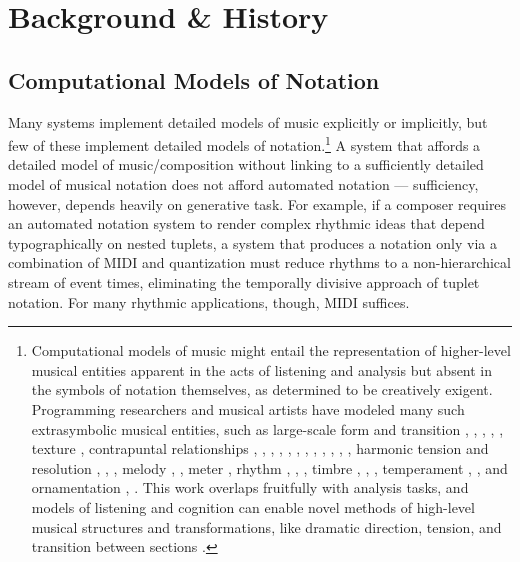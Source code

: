 \section{Background \& History}\label{sec:background}

\subsection{Computational Models of Notation}

Many systems implement detailed models of music explicitly or implicitly, but few of these implement detailed models of notation.\footnote{Computational models of music might entail the representation of higher-level musical entities apparent in the acts of listening and analysis but absent in the symbols of notation themselves, as determined to be creatively exigent. Programming researchers and musical artists have modeled many such extrasymbolic musical entities, such as large-scale form and transition \cite{polansky1991morphological}, \cite{uno1994temporal}, \cite{dobrian1995algorithmic}, \cite{abrams1999higher}, \cite{Yoo1983}, texture \cite{Horenstein:2004kx}, contrapuntal relationships \cite{Boenn:2009oq}, \cite{Acevedo2005}, \cite{Anders:2011kl}, \cite{Balser:1990tg}, \cite{Jones:2000hc}, \cite{uno1994temporal}, \cite{Bell:1995ij}, \cite{farbood2001analysis}, \cite{Cope:2002fv}, \cite{Laurson:2005dz}, \cite{Polansky:2011fu}, \cite{Ebcioglu:1980kl}, harmonic tension and resolution \cite{Melo2003}, \cite{Wiggins1999}, \cite{Foster:1995qa}, melody \cite{Hornel:1993mi}, \cite{Smith:1992pi}, meter \cite{Hamanaka:2005ff}, rhythm \cite{Nauert2007}, \cite{Degazio:1996lh}, \cite{Collins:2003bs}, timbre \cite{Xenakis:1991fu}, \cite{Creasey:1996ye}, \cite{Osaka2004}, temperament \cite{Seymour:2007qo}, \cite{Graf:2006il}, and ornamentation \cite{Ariza:2003zt}, \cite{Chico-Topfer:1998jl}. This work overlaps fruitfully with analysis tasks, and models of listening and cognition can enable novel methods of high-level musical structures and transformations, like dramatic direction, tension, and transition between sections \cite[108]{Collins2009}.} A system that affords a detailed model of music/composition without linking to a sufficiently detailed model of musical notation does not afford automated notation --- sufficiency, however, depends heavily on generative task. For example, if a composer requires an automated notation system to render complex rhythmic ideas that depend typographically on nested tuplets, a system that produces a notation only via a combination of MIDI and quantization must reduce rhythms to a non-hierarchical stream of event times, eliminating the temporally divisive approach of tuplet notation. For many rhythmic applications, though, MIDI suffices. 


